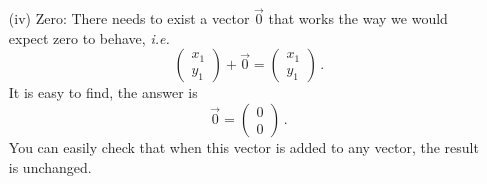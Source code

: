 {\begin{enumerate}
\[\begin{pmatrix}y_1\\y_2\end{pmatrix}\right)+
\begin{pmatrix}z_1\\z_2\end{pmatrix}
=
\begin{pmatrix}x_1+y_1\\x_2+y_2\end{pmatrix}+
\begin{pmatrix}z_1\\z_2\end{pmatrix}
=
\begin{pmatrix}(x_1+y_1)+z_1\\(x_2+y_2)+z_2\end{pmatrix}
\] \[
=
\begin{pmatrix}x_1+(y_1+z_1)\\x_2+(y_2+z_2)\end{pmatrix}
=
\begin{pmatrix}x_1\\ y_1\end{pmatrix}+
\begin{pmatrix}y_1+z_1\\y_2+z_2\end{pmatrix}=
\begin{pmatrix}x_1\\x_2\end{pmatrix}+
\left(\begin{pmatrix}y_1\\y_2\end{pmatrix}+
\begin{pmatrix}z_1\\z_2\end{pmatrix}\right)\, .\]
\item[(iv)] Zero: There needs to exist a vector $\vec 0$ that works the way we would 
expect zero to behave, {\it i.e.}
\[
\begin{pmatrix}x_1\\y_1\end{pmatrix}+\vec 0=\begin{pmatrix}x_1\\y_1\end{pmatrix}\, .
\]
It is easy to find, the answer is
\[
\vec 0 = \begin{pmatrix}0\\0\end{pmatrix}\, .
\]
You can easily  check that when this vector is added to any vector, the result is unchanged.

\end{enumerate}}
